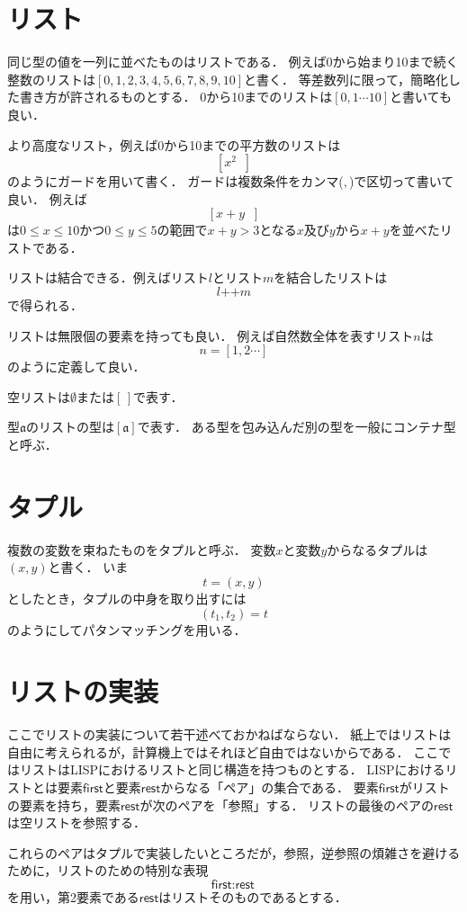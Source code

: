 \documentclass[twocolumn]{jsbook}
\newcommand{\firstelem}{\textsf{first}}
\newcommand{\guard}[1]{\mathop{\mid_{{#1}}}}
\newcommand{\listappend}{\mathop{++}}
\newcommand{\restelems}{\textsf{rest}}
\newcommand{\typename}[1]{\mathfrak{#1}}
\begin{document}
\section{リスト}

同じ型の値を一列に並べたものはリストである．
例えば0から始まり10まで続く整数のリストは$[0,1,2,3,4,5,6,7,8,9,10]$と書く．
等差数列に限って，簡略化した書き方が許されるものとする．
0から10までのリストは$[0,1\dotsb10]$と書いても良い．

より高度なリスト，例えば0から10までの平方数のリストは$$\left[x^2\guard{x\in[0,1\dotsb 10]}\right]$$のようにガードを用いて書く．
ガードは複数条件をカンマ($,$)で区切って書いて良い．
例えば$$\left[x+y\guard{x\in[0,1\dotsb 10],\,y\in[0,1\dotsb 5],\,x+y>3}\right]$$は$0\le x\le 10$かつ$0\le y\le 5$の範囲で$x+y>3$となる$x$及び$y$から$x+y$を並べたリストである．

リストは結合できる．例えばリスト$l$とリスト$m$を結合したリストは$$l\listappend m$$で得られる．

リストは無限個の要素を持っても良い．
例えば自然数全体を表すリスト$n$は$$n=[1,2\dotsb]$$のように定義して良い．

空リストは$\emptyset$または$[\,]$で表す．

型$\typename{a}$のリストの型は$[\typename{a}]$で表す．
ある型を包み込んだ別の型を一般にコンテナ型と呼ぶ．

\section{タプル}

複数の変数を束ねたものをタプルと呼ぶ．
変数$x$と変数$y$からなるタプルは$(x,y)$と書く．
いま$$t=(x,y)$$としたとき，タプルの中身を取り出すには$$(t_1,t_2)=t$$のようにしてパタンマッチングを用いる．

\section{リストの実装}

ここでリストの実装について若干述べておかねばならない．
紙上ではリストは自由に考えられるが，計算機上ではそれほど自由ではないからである．
ここではリストはLISPにおけるリストと同じ構造を持つものとする．
LISPにおけるリストとは要素$\firstelem$と要素$\restelems$からなる「ペア」の集合である．
要素$\firstelem$がリストの要素を持ち，要素$\restelems$が次のペアを「参照」する．
リストの最後のペアの$\restelems$は空リストを参照する．

これらのペアはタプルで実装したいところだが，参照，逆参照の煩雑さを避けるために，リストのための特別な表現$$\firstelem:\restelems$$を用い，第2要素である$\restelems$はリストそのものであるとする．
\end{document}
